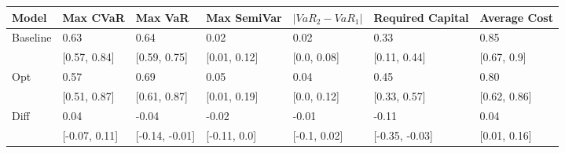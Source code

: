 \begin{tabular}{lllllll}
\toprule
   Model &      Max CVaR &        Max VaR &  Max SemiVar & $|VaR_2 - VaR_1|$ & Required Capital & Average Cost \\
\midrule
Baseline &          0.63 &           0.64 &         0.02 &              0.02 &             0.33 &         0.85 \\
         &  [0.57, 0.84] &   [0.59, 0.75] & [0.01, 0.12] &       [0.0, 0.08] &     [0.11, 0.44] &  [0.67, 0.9] \\
     Opt &          0.57 &           0.69 &         0.05 &              0.04 &             0.45 &         0.80 \\
         &  [0.51, 0.87] &   [0.61, 0.87] & [0.01, 0.19] &       [0.0, 0.12] &     [0.33, 0.57] & [0.62, 0.86] \\
    Diff &          0.04 &          -0.04 &        -0.02 &             -0.01 &            -0.11 &         0.04 \\
         & [-0.07, 0.11] & [-0.14, -0.01] & [-0.11, 0.0] &      [-0.1, 0.02] &   [-0.35, -0.03] & [0.01, 0.16] \\
\bottomrule
\end{tabular}
